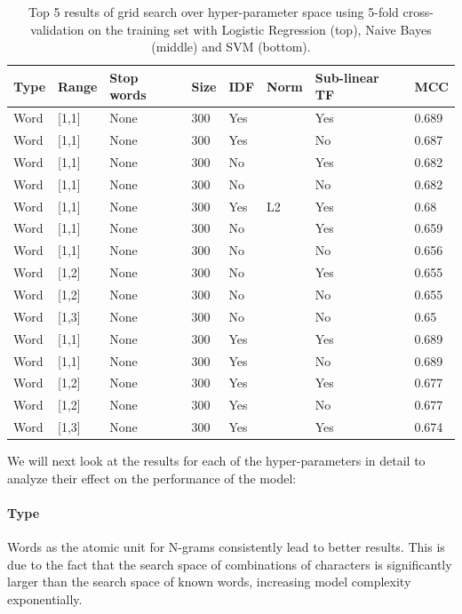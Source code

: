 \begin{table}[h]
  \begin{center}
  \begin{tabular}{ l l l l l l l l }
    \toprule
    Type & Range & Stop words & Size & IDF & Norm & Sub-linear TF & \gls{MCC} \\
    \midrule
    Word & [1,1] & None & 300 & Yes &  & Yes & 0.689 \\
    Word & [1,1] & None & 300 & Yes &  & No & 0.687 \\
    Word & [1,1] & None & 300 & No &  & Yes & 0.682 \\
    Word & [1,1] & None & 300 & No &  & No & 0.682 \\
    Word & [1,1] & None & 300 & Yes & L2 & Yes & 0.68 \\
    \midrule
    Word & [1,1] & None & 300 & No & & Yes & 0.659  \\
    Word & [1,1] & None & 300 & No & & No & 0.656 \\
    Word & [1,2] & None & 300 & No & & Yes & 0.655 \\
    Word & [1,2] & None & 300 & No & & No & 0.655 \\
    Word & [1,3] & None & 300 & No & & No & 0.65 \\
    \midrule
    Word & [1,1] & None & 300 & Yes & & Yes & 0.689 \\
    Word & [1,1] & None & 300 & Yes & & No  & 0.689 \\
    Word & [1,2] & None & 300 & Yes & & Yes & 0.677 \\
    Word & [1,2] & None & 300 & Yes & & No  & 0.677 \\
    Word & [1,3] & None & 300 & Yes & & Yes & 0.674 \\
    \bottomrule
  \end{tabular}
  \caption{Top 5 results of grid search over hyper-parameter space using 5-fold cross-validation on the training set with Logistic Regression (top), Naive Bayes (middle) and SVM (bottom).}
\label{tab:Ngram Grid Search}
\end{center}
\end{table}

We will next look at the results for each of the hyper-parameters in detail to analyze their effect on the performance of the model:

\paragraph{Type}
\label{par:Type}
Words as the atomic unit for N-grams consistently lead to better results. This is due to the fact that the search space of combinations of characters is significantly larger than the search space of known words, increasing model complexity exponentially.

